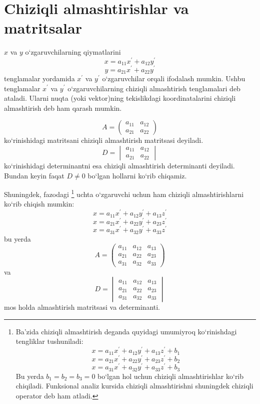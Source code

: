 \section{Chiziqli almashtirishlar va matritsalar}

$x$ va $y$ o`zgaruvchilarning qiymatlarini 
$$x=a_{11}x^\prime+a_{12}y^\prime$$
$$y=a_{21}x^{\prime}+a_{22}y^\prime$$
tenglamalar yordamida $x^\prime$ va $y^\prime$ o`zgaruvchilar orqali ifodalash mumkin. Ushbu tenglamalar $x^\prime$ va $y^\prime$ o`zgaruvchilarning chiziqli almashtirish tenglamalari deb ataladi. Ularni nuqta (yoki vektor)ning tekislikdagi koordinatalarini chiziqli almashtirish deb ham qarash mumkin. 

$$A=\begin{pmatrix}
	a_{11}&a_{12}\\
	a_{21}&a_{22}
\end{pmatrix}$$ ko`rinishidagi matritsani chiziqli almashtirish matritsasi deyiladi. 
$$D=\begin{vmatrix}
	a_{11}&a_{12}\\
	a_{21}&a_{22}
\end{vmatrix}$$ko`rinishidagi determinantni esa chiziqli almashtirish determinanti deyiladi. Bundan keyin faqat $D\ne0$ bo`lgan hollarni ko`rib chiqamiz.

Shuningdek, fazodagi \footnote[1]{Ba'zida chiziqli almashtirish deganda quyidagi umumiyroq ko`rinishdagi tengliklar tushuniladi:
	$$x=a_{11}x^\prime+a_{12}y^\prime+a_{13}z^\prime+b_1$$
	$$x=a_{21}x^\prime+a_{22}y^\prime+a_{23}z^\prime+b_2$$
	$$x=a_{31}x^\prime+a_{32}y^\prime+a_{33}z^\prime+b_3$$
Bu yerda $b_1=b_2=b_3=0$ bo`lgan hol uchun chiziqli almashtirishlar ko`rib chiqiladi. Funksional analiz kursida chiziqli almashtirishni shuningdek chiziqli operator deb ham atladi.} uchta o`zgaruvchi uchun ham chiziqli almashtirishlarni ko`rib chiqish mumkin:
$$x=a_{11}x^\prime+a_{12}y^\prime+a_{13}z^\prime$$
$$x=a_{21}x^\prime+a_{22}y^\prime+a_{23}z^\prime$$
$$x=a_{31}x^\prime+a_{32}y^\prime+a_{33}z^\prime$$
bu yerda 
$$A=\begin{pmatrix}
	a_{11}&a_{12}&a_{13}\\
	a_{21}&a_{22}&a_{23}\\
	a_{31}&a_{32}&a_{33}
\end{pmatrix}$$
va 
$$D=\begin{vmatrix}
	a_{11}&a_{12}&a_{13}\\
	a_{21}&a_{22}&a_{23}\\
	a_{31}&a_{32}&a_{33}
\end{vmatrix}$$
mos holda almashtirish matritsasi va determinanti.

